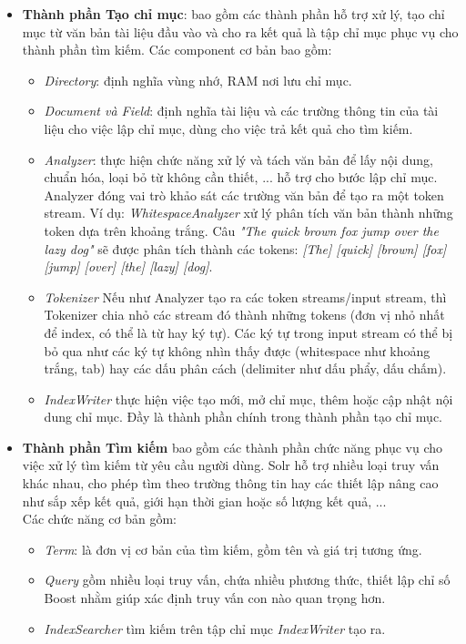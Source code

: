 \begin{itemize}
    \item \textbf{Thành phần Tạo chỉ mục}: bao gồm các thành phần hỗ trợ xử lý, tạo chỉ mục từ văn bản tài liệu đầu vào và cho ra kết quả là tập chỉ mục phục vụ cho thành phần tìm kiếm. Các component cơ bản bao gồm:
    \begin{itemize}
        \item \textit{Directory}: định nghĩa vùng nhớ, RAM nơi lưu chỉ mục.
        \item \textit{Document và Field}: định nghĩa tài liệu và các trường thông tin của tài liệu cho việc lập chỉ mục, dùng cho việc trả kết quả cho tìm kiếm.
        \item\textit{Analyzer}: thực hiện chức năng xử lý và tách văn bản để lấy nội dung, chuẩn hóa, loại bỏ từ không cần thiết, ... hỗ trợ cho bước lập chỉ mục. \\
        Analyzer đóng vai trò khảo sát các trường văn bản để tạo ra một token stream. Ví dụ: \textit{WhitespaceAnalyzer} xử lý phân tích văn bản thành những token dựa trên khoảng trắng. Câu \textit{"The quick brown fox jump over the lazy dog"} sẽ được phân tích thành các tokens: \textit{[The] [quick] [brown] [fox] [jump] [over] [the] [lazy] [dog]}.
        
        \item\textit{Tokenizer} Nếu như Analyzer tạo ra các token streams/input stream, thì Tokenizer chia nhỏ các stream đó thành những tokens (đơn vị nhỏ nhất để index, có thể là từ hay ký tự). Các ký tự trong input stream có thể bị bỏ qua như các ký tự không nhìn thấy được (whitespace như khoảng trắng, tab) hay các dấu phân cách (delimiter như dấu phẩy, dấu chấm).

        \item\textit{IndexWriter} thực hiện việc tạo mới, mở chỉ mục, thêm hoặc cập nhật nội dung chỉ mục. Đầy là thành phần chính trong thành phần tạo chỉ mục.
    \end{itemize}
    
    \item\textbf{Thành phần Tìm kiếm} bao gồm các thành phần chức năng phục vụ cho việc xử lý tìm kiếm từ yêu cầu người dùng. Solr hỗ trợ nhiều loại truy vấn khác nhau, cho phép tìm theo trường thông tin hay các thiết lập nâng cao như sắp xếp kết quả, giới hạn thời gian hoặc số lượng kết quả, ... \\
    Các chức năng cơ bản gồm:
    \begin{itemize}
        \item\textit{Term}: là đơn vị cơ bản của tìm kiếm, gồm tên và giá trị tương ứng.
        \item\textit{Query} gồm nhiều loại truy vấn, chứa nhiều phương thức, thiết lập chỉ số Boost nhằm giúp xác định truy vấn con nào quan trọng hơn.
        \item\textit{IndexSearcher} tìm kiếm trên tập chỉ mục \textit{IndexWriter} tạo ra.
    \end{itemize}
\end{itemize}

